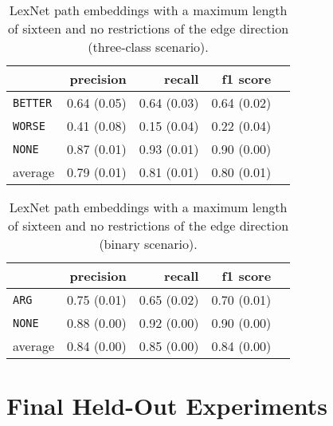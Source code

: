 	\begin{table}[h] 
		\centering 
		\caption{LexNet path embeddings with a maximum length of sixteen and no restrictions of the edge direction (three-class scenario).} 
		\label{  }
		\begin{tabular}{@{}lrrrr@{}}
			\toprule
			        & precision                & recall                   & f1 score                 \\ \midrule 
			\texttt{BETTER}  & 0.64 \scriptsize{(0.05)} & 0.64 \scriptsize{(0.03)} & 0.64 \scriptsize{(0.02)} \\ 
			\texttt{WORSE}   & 0.41 \scriptsize{(0.08)} & 0.15 \scriptsize{(0.04)} & 0.22 \scriptsize{(0.04)} \\ 
			\texttt{NONE}    & 0.87 \scriptsize{(0.01)} & 0.93 \scriptsize{(0.01)} & 0.90 \scriptsize{(0.00)} \\ 
			average & 0.79 \scriptsize{(0.01)} & 0.81 \scriptsize{(0.01)} & 0.80 \scriptsize{(0.01)} \\ 
			\bottomrule
		\end{tabular}
	\end{table}
	
	\begin{table}[h] 
		\centering 
		\caption{LexNet path embeddings with a maximum length of sixteen and no restrictions of the edge direction (binary scenario).} 
		\label{  }
		\begin{tabular}{@{}lrrrr@{}}
			\toprule
			        & precision                & recall                   & f1 score                 \\ \midrule 
			\texttt{ARG}     & 0.75 \scriptsize{(0.01)} & 0.65 \scriptsize{(0.02)} & 0.70 \scriptsize{(0.01)} \\ 
			\texttt{NONE}    & 0.88 \scriptsize{(0.00)} & 0.92 \scriptsize{(0.00)} & 0.90 \scriptsize{(0.00)} \\ 
			average & 0.84 \scriptsize{(0.00)} & 0.85 \scriptsize{(0.00)} & 0.84 \scriptsize{(0.00)} \\ 
			\bottomrule
		\end{tabular}
	\end{table}
	
\section{Final Held-Out Experiments}
